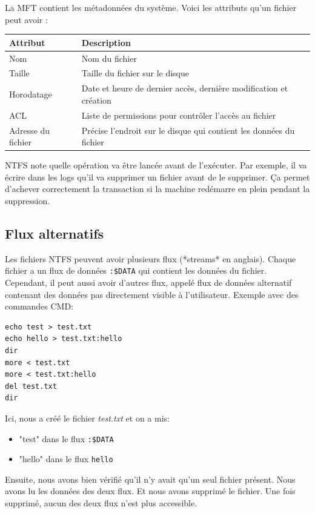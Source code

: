 \documentclass[a4paper]{article}
\begin{document}
La MFT contient les métadonnées du système. Voici les attributs qu'un fichier peut avoir :
\begin{center}
    \begin{tabular}{|l|l|} \hline
        \textbf{Attribut}           & \textbf{Description} \\ \hline
        Nom                & Nom du fichier \\
        Taille             & Taille du fichier sur le disque \\
        Horodatage         & Date et heure de dernier accès, dernière modification et création \\
        ACL                & Liste de permissions pour contrôler l'accès au fichier \\
        Adresse du fichier & Précise l'endroit sur le disque qui contient les données du fichier \\ \hline
    \end{tabular}
\end{center}

NTFS note quelle opération va être lancée avant de l'exécuter. Par exemple, il va écrire dans les logs qu'il va supprimer un fichier avant de le supprimer. Ça permet d'achever correctement la transaction si la machine redémarre en plein pendant la suppression.



\subsection{Flux alternatifs}

Les fichiers NTFS peuvent avoir plusieurs flux (*streams* en anglais). Chaque fichier a un flux de données {\small \texttt{:\$DATA}} qui contient les données du fichier. Cependant, il peut aussi avoir d'autres flux, appelé flux de données alternatif contenant des données pas directement visible à l'utilisateur. Exemple avec des commandes CMD:
\begin{example}
\begin{Verbatim}[fontsize=\small]
echo test > test.txt
echo hello > test.txt:hello
dir
more < test.txt
more < test.txt:hello
del test.txt
dir
\end{Verbatim}
\end{example}
Ici, nous a créé le fichier \textit{test.txt} et on a mis:
\begin{itemize}
    \item "test" dans le flux {\small \texttt{:\$DATA}}
    \item "hello" dans le flux {\small \texttt{hello}}
\end{itemize}
Ensuite, nous avons bien vérifié qu'il n'y avait qu'un seul fichier présent. Nous avons lu les données des deux flux. Et nous avons supprimé le fichier. Une fois supprimé, aucun des deux flux n'est plus accessible.
\end{document}
